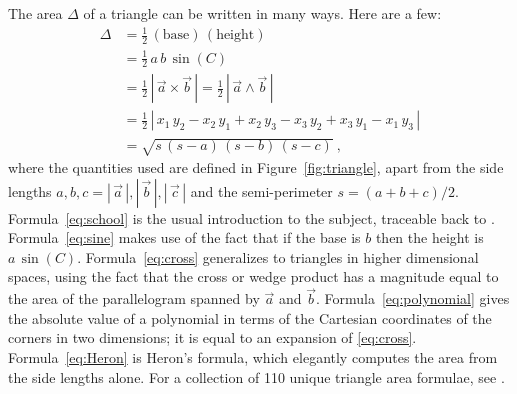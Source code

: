 \documentclass[10pt]{article}
\newcommand{\secbreak}{\bigskip{\centering\footnotesize%
\rotatebox[origin=c]{55}{$\triangle$}~~~%
\rotatebox[origin=c]{35}{$\triangle$}~~~%
\rotatebox[origin=c]{15}{$\triangle$}\par}\bigskip\noindent}
\newcommand{\abs}[1]{|\,{#1}\,|}
\begin{document}
\secbreak
The area $\Delta$ of a triangle can be written in many ways.
Here are a few:
\begin{align}
\Delta 
&= \frac{1}{2} \, (\text{base}) \, (\text{height}) \label{eq:school} \\
&= \frac{1}{2}\,a\,b\,\sin(C) \label{eq:sine} \\
&= \frac{1}{2}\, \abs{\vec{a} \times \vec{b}}
    = \frac{1}{2}\, \abs{\vec{a} \wedge \vec{b}}\label{eq:cross} \\
&= \frac{1}{2}\, \abs{
    x_1 \, y_2 - x_2 \, y_1 +
    x_2 \, y_3 - x_3 \, y_2 +
    x_3 \, y_1 - x_1 \, y_3
}\label{eq:polynomial} \\
&= \sqrt{s\,(s-a)\,(s-b)\,(s-c)} \label{eq:Heron} ~,
\end{align}
where the quantities used are defined in Figure~\ref{fig:triangle}, apart from the side lengths
$a, b, c = \abs{\vec{a}}, \abs{\vec{b}}, \abs{\vec{c}}$
and the semi-perimeter $s = (a + b + c)/2$.
Formula~\eqref{eq:school} is the usual introduction to the subject, traceable back to \citet{Euclid300BC}.
Formula~\eqref{eq:sine} makes use of the fact that if the base is $b$ then the height is $a\,\sin(C)$.
Formula~\eqref{eq:cross} generalizes to triangles in higher dimensional spaces, using the fact that the cross or wedge product has a magnitude equal to the area of the parallelogram spanned by $\vec{a}$ and $\vec{b}$.
Formula~\eqref{eq:polynomial} gives the absolute value of a polynomial in terms of the Cartesian coordinates of the corners in two dimensions; it is equal to an expansion of \eqref{eq:cross}.
Formula~\eqref{eq:Heron} is Heron's formula, which elegantly computes the area from the side lengths alone.
For a collection of 110 unique triangle area formulae, see \citet{Baker1885a,Baker1885b}.
\end{document}
